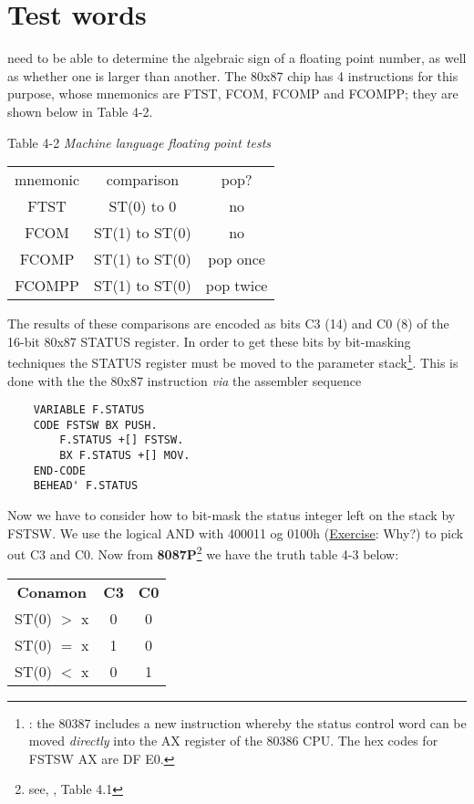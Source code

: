 \section{Test words}

 need to be able to determine the algebraic sign of a floating point number, as well as whether one is larger than another.
The 80x87 chip has 4 instructions for this purpose, whose mnemonics are FTST, FCOM, FCOMP and FCOMPP; they are shown below in Table 4-2.

Table 4-2 \textit{Machine language floating point tests}
\begin{center}
    \begin{tabular}{|c c c|}
        \hline
        mnemonic    &   comparison      &   pop?        \\
        FTST        &   ST(0) to 0      &   no          \\
        FCOM        &   ST(1) to ST(0)  &   no          \\
        FCOMP       &   ST(1) to ST(0)  &   pop once    \\
        FCOMPP      &   ST(1) to ST(0)  &   pop twice   \\
        \hline
    \end{tabular}
\end{center}

The results of these comparisons are encoded as bits C3 (14) and C0 (8) of the 16-bit 80x87 STATUS register. In order to get these bits by bit-masking techniques the STATUS register must be moved to the parameter stack\footnote{\Note: the 80387 includes a new instruction whereby the status control word can be moved \textit{directly} into the AX register of the 80386 CPU. The hex codes for FSTSW AX are DF E0.}. This is done with the the 80x87 instruction  \textit{via} the assembler sequence

\begin{lstlisting}
    VARIABLE F.STATUS
    CODE FSTSW BX PUSH.
        F.STATUS +[] FSTSW.
        BX F.STATUS +[] MOV.
    END-CODE
    BEHEAD' F.STATUS
\end{lstlisting}

Now we have to consider how to bit-mask the status integer left on the stack by FSTSW. We use the logical AND with 400011 og 0100h (\underline{Exercise}: Why?) to pick out C3 and C0. Now from \textbf{8087P}\footnote{see, \eg, Table 4.1} we have the truth table 4-3 below:

\begin{center}
    \begin{tabular}{|c c c|}
        \hline
        \textbf{Conamon}    &   \textbf{C3} & \textbf{C0} \\
        ST(0) $>$ x           &   0           & 0         \\
        ST(0) $=$ x           &   1           & 0         \\
        ST(0) $<$ x           &   0           & 1         \\
        \hline
    \end{tabular}
\end{center}

